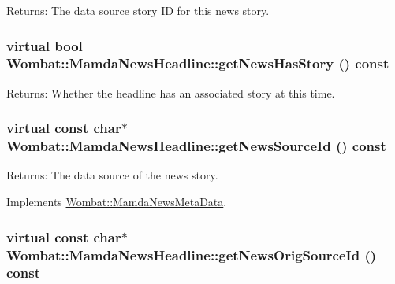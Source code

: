 \begin{Desc}
\item[Returns:]The data source story ID for this news story. \end{Desc}
\hypertarget{classWombat_1_1MamdaNewsHeadline_934c8dded380d1c59a0d9d59528f81b5}{
\subsubsection[getNewsHasStory]{\setlength{\rightskip}{0pt plus 5cm}virtual bool Wombat::Mamda\-News\-Headline::get\-News\-Has\-Story () const}}
\label{classWombat_1_1MamdaNewsHeadline_934c8dded380d1c59a0d9d59528f81b5}


\begin{Desc}
\item[Returns:]Whether the headline has an associated story at this time. \end{Desc}
\hypertarget{classWombat_1_1MamdaNewsHeadline_7566bd0297c11ef707348d9d3646363b}{
\subsubsection[getNewsSourceId]{\setlength{\rightskip}{0pt plus 5cm}virtual const char$\ast$ Wombat::Mamda\-News\-Headline::get\-News\-Source\-Id () const}}
\label{classWombat_1_1MamdaNewsHeadline_7566bd0297c11ef707348d9d3646363b}


\begin{Desc}
\item[Returns:]The data source of the news story. \end{Desc}


Implements \hyperlink{classWombat_1_1MamdaNewsMetaData_bc4fae00154c4b27324e1da1d25585ce}{Wombat::Mamda\-News\-Meta\-Data}.\hypertarget{classWombat_1_1MamdaNewsHeadline_1e7a0a1b7ac2373b2d59c474f8962527}{
\subsubsection[getNewsOrigSourceId]{\setlength{\rightskip}{0pt plus 5cm}virtual const char$\ast$ Wombat::Mamda\-News\-Headline::get\-News\-Orig\-Source\-Id () const}}
\label{classWombat_1_1MamdaNewsHeadline_1e7a0a1b7ac2373b2d59c474f8962527}


